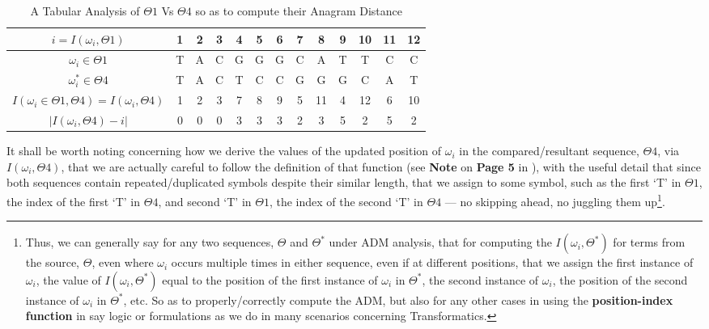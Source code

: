 \documentclass[a4paper, 18pt]{book} %
\begin{document}
\begin{center}

\begin{table}[H]
\centering
\begin{tabular}[t]{|c||c|c|c|c|c|c|c|c|c|c|c|c|}
\hline
$i = I(\omega_i,\Theta1)$ & 1 & 2 & 3 & 4 & 5 & 6 & 7 & 8 & 9 & 10 & 11 & 12\\
\hline
$\omega_i \in \Theta1$ & T & A & C & G & G & G & C & A & T & T & C & C\\
\hline
$\omega^*_i \in \Theta4$ & T & A & C & T & C & C & G & G & G & C & A & T\\
\hline
$I(\omega_i \in \Theta1,\Theta4) = I(\omega_i,\Theta4)$ & 1 & 2 & 3 & 7 & 8 & 9 & 5 & 11 & 4 & 12 & 6 & 10\\
\hline
$|I(\omega_i,\Theta4) - i|$ & 0 & 0 & 0 & 3 & 3 & 3 & 2 & 3 & 5 & 2 & 5 & 2\\
\hline
\end{tabular}
\caption{A Tabular Analysis of $\Theta1$ Vs $\Theta4$ so as to compute their Anagram Distance}
\label{TABADM1}
\end{table}

\end{center}

It shall be worth noting concerning how we derive the values of the updated position of $\omega_i$ in the compared/resultant sequence, $\Theta4$, via $I(\omega_i,\Theta4)$, that we are actually careful to follow the definition of that function (see \textbf{Note} on \textbf{Page 5} in \cite{transformatics}), with the useful detail that since both sequences contain repeated/duplicated symbols despite their similar length, that we assign to some symbol, such as the first `T' in $\Theta1$, the index of the first `T' in $\Theta4$, and second `T' in $\Theta1$, the index of the second `T' in $\Theta4$ --- no skipping ahead, no juggling them up\footnote{Thus, we can generally say for any two sequences, $\Theta$ and $\Theta^*$ under ADM analysis, that for computing the $I(\omega_i,\Theta^*)$ for terms from the source, $\Theta$, even where $\omega_i$ occurs multiple times in either sequence, even if at different positions, that we assign the first instance of $\omega_i$, the value of $I(\omega_i,\Theta^*)$ equal to the position of the first instance of $\omega_i$ in $\Theta^*$, the second instance of $\omega_i$, the position of the second instance of $\omega_i$ in $\Theta^*$, etc. So as to properly/correctly compute the ADM, but also for any other cases in using the \textbf{position-index function} in say logic or formulations as we do in many scenarios concerning Transformatics.}.
\end{document}
